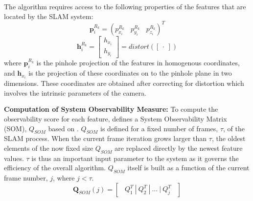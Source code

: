 \documentclass[10pt,twocolumn,letterpaper]{article}
\begin{document}
The algorithm requires access to the following properties of the features that are located by the SLAM system: 
\begin{equation} \label{eq:featureProjection}
\boldsymbol{p}_{i}^{R_k} = ({p}_{x_i}^{R_k} \ \ \ \  {p}_{y_i}^{R_k}  \ \ \ \  {p}_{z_i}^{R_k})^T
\end{equation}
\begin{equation} \label{eq:featureProjection2}
\boldsymbol{h}_{i}^{R_k} = \begin{bmatrix} {h}_{x_i} \\ {h}_{y_i} \end{bmatrix} = distort(\begin{bmatrix} . \end{bmatrix})
\end{equation}
where $\boldsymbol{p}_{i}^{R_k}$ is the pinhole projection of the features in homogenous coordinates, and 
$\boldsymbol{h}_{x_i}$ is the projection of these coordinates on to the pinhole plane in two dimensions. 
These coordinates are obtained after correcting for distortion which involves the intrinsic parameters of the
 camera.

\textbf{Computation of System Observability Measure:} To compute the observability score for each feature,
\cite{Zhang_2015_CVPR} defines a System Observability Matrix (SOM), ${Q}_{SOM}$ based on \cite{gf15}. ${Q}_{SOM}$ is defined for a fixed number 
of frames, $\tau$, of the SLAM process. When the current frame iteration grows larger than $\tau$, the oldest
 elements of the now fixed size ${Q}_{SOM}$ are replaced directly by the newest feature values. $\tau$ is 
 thus an important input parameter to the system as it governs the efficiency of the overall algorithm. 
 ${Q}_{SOM}$ itself is built as a function of the current frame number, $j$, where 
 $j<\tau$. 
\begin{equation} \label{eq:qsom}
\boldsymbol{Q}_{SOM}(j) = \begin{bmatrix} \ \ Q_1^T \ | \ Q_2^T \ | \ ... \ | \ Q_j^T  \ \ \end{bmatrix}
\end{equation}
\end{document}
